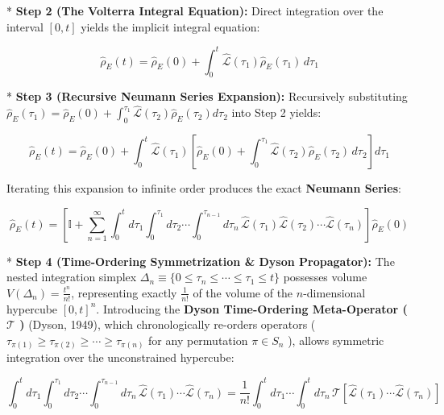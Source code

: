 \documentclass[11pt,a4paper]{article}
\theoremstyle{definition}
\theoremstyle{remark}
\begin{document}
* \textbf{Step 2 (The Volterra Integral Equation):}
Direct integration over the interval $[0, t]$ yields the implicit integral equation:


\begin{equation}
\hat{\rho}_E(t) = \hat{\rho}_E(0) + \int_0^t \hat{\mathcal{L}}(\tau_1) \hat{\rho}_E(\tau_1) \, d\tau_1
\end{equation}


* \textbf{Step 3 (Recursive Neumann Series Expansion):}
Recursively substituting $\hat{\rho}_E(\tau_1) = \hat{\rho}_E(0) + \int_0^{\tau_1} \hat{\mathcal{L}}(\tau_2) \hat{\rho}_E(\tau_2) d\tau_2$ into Step 2 yields:


\begin{equation}
\hat{\rho}_E(t) = \hat{\rho}_E(0) + \int_0^t \hat{\mathcal{L}}(\tau_1) [ \hat{\rho}_E(0) + \int_0^{\tau_1} \hat{\mathcal{L}}(\tau_2) \hat{\rho}_E(\tau_2) \, d\tau_2 ] d\tau_1
\end{equation}


Iterating this expansion to infinite order produces the exact \textbf{Neumann Series}:


\begin{equation}
\hat{\rho}_E(t) = [ \mathbb{I} + \sum_{n=1}^\infty \int_0^t d\tau_1 \int_0^{\tau_1} d\tau_2 \cdots \int_0^{\tau_{n-1}} d\tau_n \, \hat{\mathcal{L}}(\tau_1) \hat{\mathcal{L}}(\tau_2) \cdots \hat{\mathcal{L}}(\tau_n) ] \hat{\rho}_E(0)
\end{equation}


* \textbf{Step 4 (Time-Ordering Symmetrization \& Dyson Propagator):}
The nested integration simplex $\Delta_n \equiv \{0 \le \tau_n \le \cdots \le \tau_1 \le t\}$ possesses volume $V(\Delta_n) = \frac{t^n}{n!}$, representing exactly $\frac{1}{n!}$ of the volume of the $n$-dimensional hypercube $[0, t]^n$. Introducing the \textbf{Dyson Time-Ordering Meta-Operator ( $\mathcal{T}$ )} (Dyson, 1949), which chronologically re-orders operators ( $\tau_{\pi(1)} \ge \tau_{\pi(2)} \ge \cdots \ge \tau_{\pi(n)}$ for any permutation $\pi \in S_n$ ), allows symmetric integration over the unconstrained hypercube:


\begin{equation}
\boxed{\int_0^t d\tau_1 \int_0^{\tau_1} d\tau_2 \cdots \int_0^{\tau_{n-1}} d\tau_n \, \hat{\mathcal{L}}(\tau_1) \cdots \hat{\mathcal{L}}(\tau_n) = \frac{1}{n!} \int_0^t d\tau_1 \cdots \int_0^t d\tau_n \, \mathcal{T}[ \hat{\mathcal{L}}(\tau_1) \cdots \hat{\mathcal{L}}(\tau_n) ]}
\end{equation}
\end{document}
